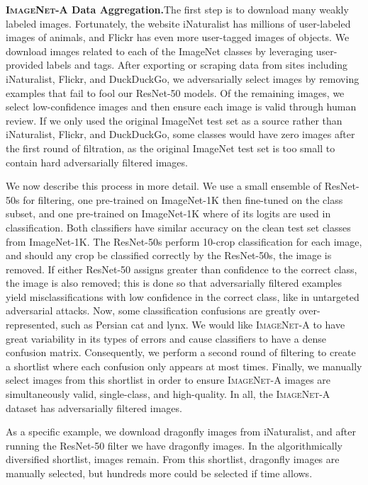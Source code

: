 \documentclass[10pt,twocolumn,letterpaper]{article}
\begin{document}
\noindent\textbf{\textsc{ImageNet-A} Data Aggregation.}\quad The first step is to download many weakly labeled images. Fortunately, the website iNaturalist has millions of user-labeled images of animals, and Flickr has even more user-tagged images of objects. We download images related to each of the  ImageNet classes by leveraging user-provided labels and tags. After exporting or scraping data from sites including iNaturalist, Flickr, and DuckDuckGo, we adversarially select images by removing examples that fail to fool our ResNet-50 models. Of the remaining images, we select low-confidence images and then ensure each image is valid through human review. If we only used the original ImageNet test set as a source rather than iNaturalist, Flickr, and DuckDuckGo, some classes would have zero images after the first round of filtration, as the original ImageNet test set is too small to contain hard adversarially filtered images.

We now describe this process in more detail. We use a small ensemble of ResNet-50s for filtering, one pre-trained on ImageNet-1K then fine-tuned on the  class subset, and one pre-trained on ImageNet-1K where  of its  logits are used in classification. Both classifiers have similar accuracy on the  clean test set classes from ImageNet-1K. The ResNet-50s perform 10-crop classification for each image, and should any crop be classified correctly by the ResNet-50s, the image is removed. If either ResNet-50 assigns greater than  confidence to the correct class, the image is also removed; this is done so that adversarially filtered examples yield misclassifications with low confidence in the correct class, like in untargeted adversarial attacks. Now, some classification confusions are greatly over-represented, such as Persian cat and lynx. We would like \textsc{ImageNet-A} to have great variability in its types of errors and cause classifiers to have a dense confusion matrix. Consequently, we perform a second round of filtering to create a shortlist where each confusion only appears at most  times. Finally, we manually select images from this shortlist in order to ensure \textsc{ImageNet-A} images are simultaneously valid, single-class, and high-quality. In all, the \textsc{ImageNet-A} dataset has  adversarially filtered images.

As a specific example, we download  dragonfly images from iNaturalist, and after running the ResNet-50 filter we have  dragonfly images. In the algorithmically diversified shortlist,  images remain. From this shortlist,  dragonfly images are manually selected, but hundreds more could be selected if time allows.
\end{document}
